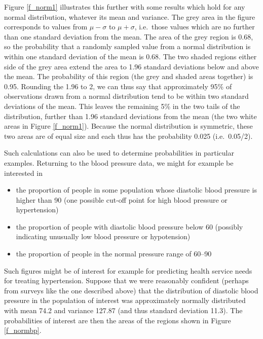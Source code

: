 Figure \ref{f_norm1} illustrates this further with some results which hold for
any normal distribution, whatever its mean and variance. The grey area
in the figure corresponds to values from $\mu-\sigma$ to $\mu+\sigma$,
i.e.\ those values which are no further than one standard deviation from
the mean. The area of the grey region is 0.68, so the probability
that a randomly sampled value from a normal distribution is within one
standard deviation of the mean is 0.68. The two shaded regions either
side of the grey area extend the area to 1.96 standard deviations below
and above the mean. The probability of this region (the grey and shaded
areas together) is 0.95. Rounding the 1.96 to 2, we can thus say that
approximately 95\% of observations drawn from a normal distribution tend
to be within two standard deviations of the mean. This leaves the
remaining 5\% in the two tails of the distribution,
further than 1.96 standard deviations from the mean (the two white areas
in Figure \ref{f_norm1}). Because the normal distribution is symmetric,
these two areas are of equal size and each thus has the probability
0.025 (i.e.\ 0.05/2).

Such calculations can also be used to determine probabilities in particular
examples. Returning to the blood pressure data,
we might for example
be interested in
\vspace*{-2ex}
\begin{itemize}
\item
the proportion of people in some population whose diastolic blood
pressure is
higher than 90 (one possible cut-off point for high blood pressure or
hypertension)
\item
the proportion of people with diastolic blood pressure below 60
(possibly indicating unusually low blood pressure or hypotension)
\item
the proportion of people in the normal pressure range of 60--90
\end{itemize}
Such figures might be of interest for example for predicting health
service needs for treating hypertension. Suppose that we were reasonably
confident (perhaps from surveys like the one described above) that the
distribution of diastolic blood pressure in the population of interest
was approximately normally distributed with mean 74.2 and variance
127.87 (and thus standard deviation 11.3). The probabilities of interest
are then the areas of the regions shown in Figure \ref{f_normbp}.


